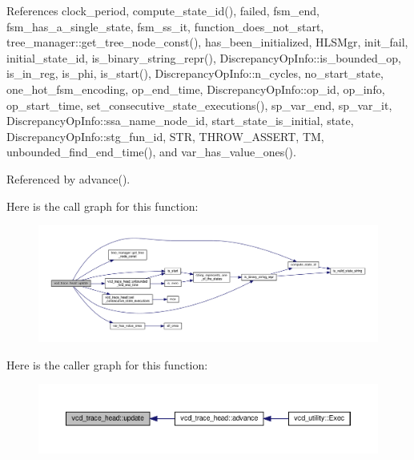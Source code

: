 References clock\+\_\+period, compute\+\_\+state\+\_\+id(), failed, fsm\+\_\+end, fsm\+\_\+has\+\_\+a\+\_\+single\+\_\+state, fsm\+\_\+ss\+\_\+it, function\+\_\+does\+\_\+not\+\_\+start, tree\+\_\+manager\+::get\+\_\+tree\+\_\+node\+\_\+const(), has\+\_\+been\+\_\+initialized, H\+L\+S\+Mgr, init\+\_\+fail, initial\+\_\+state\+\_\+id, is\+\_\+binary\+\_\+string\+\_\+repr(), Discrepancy\+Op\+Info\+::is\+\_\+bounded\+\_\+op, is\+\_\+in\+\_\+reg, is\+\_\+phi, is\+\_\+start(), Discrepancy\+Op\+Info\+::n\+\_\+cycles, no\+\_\+start\+\_\+state, one\+\_\+hot\+\_\+fsm\+\_\+encoding, op\+\_\+end\+\_\+time, Discrepancy\+Op\+Info\+::op\+\_\+id, op\+\_\+info, op\+\_\+start\+\_\+time, set\+\_\+consecutive\+\_\+state\+\_\+executions(), sp\+\_\+var\+\_\+end, sp\+\_\+var\+\_\+it, Discrepancy\+Op\+Info\+::ssa\+\_\+name\+\_\+node\+\_\+id, start\+\_\+state\+\_\+is\+\_\+initial, state, Discrepancy\+Op\+Info\+::stg\+\_\+fun\+\_\+id, S\+TR, T\+H\+R\+O\+W\+\_\+\+A\+S\+S\+E\+RT, TM, unbounded\+\_\+find\+\_\+end\+\_\+time(), and var\+\_\+has\+\_\+value\+\_\+ones().



Referenced by advance().

Here is the call graph for this function\+:
\nopagebreak
\begin{figure}[H]
\begin{center}
\leavevmode
\includegraphics[width=350pt]{df/d30/structvcd__trace__head_afebefebabc382bd2bd3d408f852668a8_cgraph}
\end{center}
\end{figure}
Here is the caller graph for this function\+:
\nopagebreak
\begin{figure}[H]
\begin{center}
\leavevmode
\includegraphics[width=350pt]{df/d30/structvcd__trace__head_afebefebabc382bd2bd3d408f852668a8_icgraph}
\end{center}
\end{figure}


